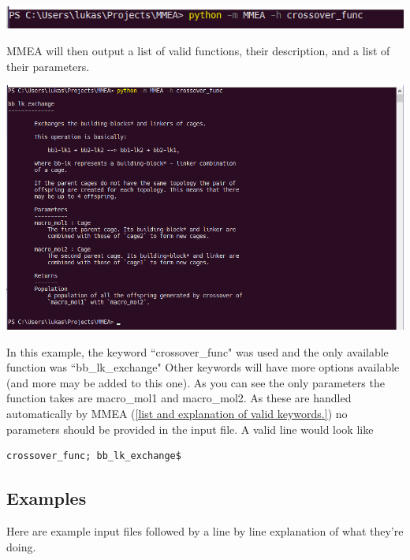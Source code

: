 \documentclass[12pt]{article}
\begin{document}
\includegraphics[scale=1]{console1}

MMEA will then output a list of valid functions, their description, and a list of their parameters.

\includegraphics[scale=0.7]{console2}

In this example, the keyword ``crossover\_func" was used and the only available function was ``bb\_lk\_exchange" Other keywords will have more options available (and more may be added to this one). As you can see the only parameters the function takes are macro\_mol1 and macro\_mol2. As these are handled automatically by MMEA (\ref{list and explanation of valid keywords.}) no parameters should be provided in the input file. A valid line would look like
\begin{verbatim}
crossover_func; bb_lk_exchange$
\end{verbatim}

\subsection{Examples}
\label{examples}
Here are example input files followed by a line by line explanation of what they're doing.
\end{document}
